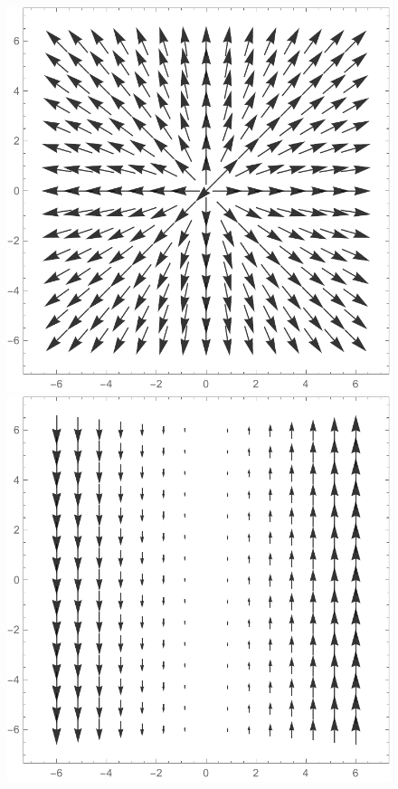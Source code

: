 \begin{Exercise}[difficulty = 2, label = Oef_grafiek_vectorvelden]
\begin{figure}[H]
\includegraphics[scale=0.41]{fig_double_32b}
\\
\includegraphics[scale=0.4]{fig_double_32c}
\hspace{1.5cm}

\end{figure}
\end{Exercise}
